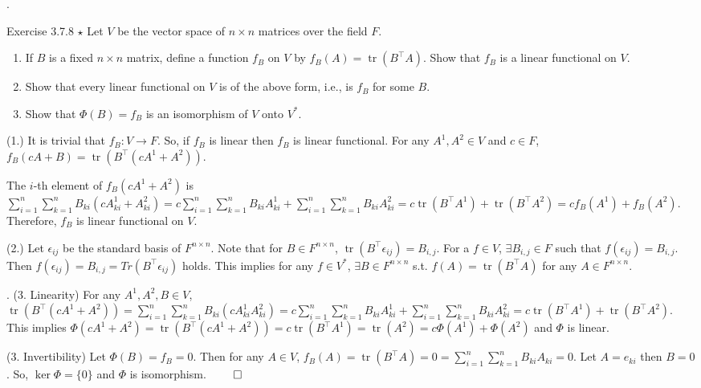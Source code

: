 \documentclass[8pt]{beamer}
\newcommand{\tr}{\operatorname{tr}}
\begin{document}
\begin{frame}{.}

    \begin{block}{Exercise 3.7.8 $\star$} 
        Let $V$ be the vector space of $n \times n$ matrices over the field $F$.
        \begin{enumerate}
            \item If $B$ is a fixed $n\times n$ matrix, define a function $f_B$ on $V$ by $f_B(A) = \tr(B^\top A)$.
            Show that $f_B$ is a linear functional on $V$.
            \item Show that every linear functional on $V$ is of the above form, i.e., is $f_B$ for some $B$.
            \item Show that $\Phi(B) = f_B$ is an isomorphism of $V$ onto $V^\ast$.
        \end{enumerate}

        (1.) It is trivial that $f_B: V \to F$.
        So, if $f_B$ is linear then $f_B$ is linear functional.
        For any $A^1, A^2 \in V$ and $c \in F$, $f_B(cA +B) = \tr(B^\top(cA^1+A^2))$.

        The $i$-th element of $f_B(cA^1+A^2)$ is $\sum_{i=1}^n \sum_{k=1}^n B_{ki} (cA^1_{ki} + A^2_{ki}) = c\sum_{i=1}^n\sum_{k=1}^n B_{ki}A^1_{ki} + \sum_{i=1}^n\sum_{k=1}^n B_{ki} A^2_{ki} = c\tr(B^\top A^1)+ \tr(B^\top A^2) = cf_B(A^1) +f_B(A^2)$.
        Therefore, $f_B$ is linear functional on $V$.

        \smallskip
        (2.) Let $\epsilon_{ij}$ be the standard basis of $F^{n\times n}$.
        Note that for $B \in F^{n\times n}$, $\tr(B^\top \epsilon_{ij}) = B_{i,j}$.
        For a $f \in V$, $\exists B_{i,j} \in F$ such that $f(\epsilon_{ij}) = B_{i,j}$.
        Then $f(\epsilon_{ij}) = B_{i,j} =Tr(B^\top \epsilon_{ij})$ holds.
        This implies for any $f \in V^\ast$, $\exists B \in F^{n \times n}$ s.t. $f(A) = \tr(B^\top A)$ for any $A \in F^{n \times n}$.
    \end{block}
\end{frame}

\begin{frame}{.}
    \smallskip
    (3. Linearity) For any $A^1, A^2, B \in V$, $\tr(B^\top(cA^1 + A^2)) = \sum_{i=1}^n \sum_{k=1}^n B_{ki} (cA^1_{ki} A^2_{ki}) = c\sum_{i=1}^n \sum_{k=1}^n B_{ki} A^1_{ki} + \sum_{i=1}^n \sum_{k=1}^n B_{ki} A^2_{ki} = c\tr(B^\top A^1) + \tr(B^\top A^2)$.
    This implies $\Phi(cA^1 + A^2) = \tr(B^\top(cA^1 + A^2)) = c\tr(B^\top A^1) = \tr(A^2) = c \Phi(A^1) + \Phi(A^2)$ and $\Phi$ is linear.

    (3. Invertibility) Let $\Phi(B) = f_B =0$.
    Then for any $A \in V$, $f_B(A) = \tr(B^\top A) = 0 = \sum_{i=1}^n \sum_{k=1}^n B_{ki} A_{ki} = 0$.
    Let $A = e_{ki}$ then $B = 0$.
    So, $\ker \Phi = \{0\}$ and $\Phi$ is isomorphism.
    $\qed$

\end{frame}
\end{document}
